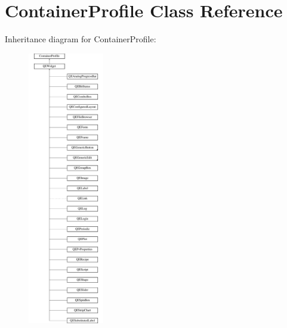 \hypertarget{classContainerProfile}{
\section{ContainerProfile Class Reference}
\label{classContainerProfile}
}
Inheritance diagram for ContainerProfile:\begin{figure}[H]
\begin{center}
\leavevmode
\includegraphics[height=12.000000cm]{classContainerProfile}
\end{center}
\end{figure}
